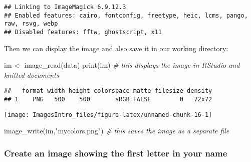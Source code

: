 \documentclass[
]{article}
\newenvironment{Shaded}{\begin{snugshade}}{\end{snugshade}}
\newcommand{\CommentTok}[1]{\textcolor[rgb]{0.56,0.35,0.01}{\textit{#1}}}
\newcommand{\FunctionTok}[1]{\textcolor[rgb]{0.00,0.00,0.00}{#1}}
\newcommand{\NormalTok}[1]{#1}
\newcommand{\OtherTok}[1]{\textcolor[rgb]{0.56,0.35,0.01}{#1}}
\newcommand{\StringTok}[1]{\textcolor[rgb]{0.31,0.60,0.02}{#1}}
\begin{document}
\begin{verbatim}
## Linking to ImageMagick 6.9.12.3
## Enabled features: cairo, fontconfig, freetype, heic, lcms, pango, raw, rsvg, webp
## Disabled features: fftw, ghostscript, x11
\end{verbatim}

Then we can display the image and also save it in our working directory:

\begin{Shaded}
\begin{Highlighting}[]
\NormalTok{im }\OtherTok{\textless{}{-}} \FunctionTok{image\_read}\NormalTok{(data) }
\FunctionTok{print}\NormalTok{(im) }\CommentTok{\# this displays the image in RStudio and knitted documents}
\end{Highlighting}
\end{Shaded}

\begin{verbatim}
##   format width height colorspace matte filesize density
## 1    PNG   500    500       sRGB FALSE        0   72x72
\end{verbatim}

\texttt{[image: ImagesIntro\_files/figure-latex/unnamed-chunk-16-1]}

\begin{Shaded}
\begin{Highlighting}[]
\FunctionTok{image\_write}\NormalTok{(im,}\StringTok{"mycolors.png"}\NormalTok{) }\CommentTok{\# this saves the image as a separate file}
\end{Highlighting}
\end{Shaded}

\hypertarget{create-an-image-showing-the-first-letter-in-your-name}{%
\subsubsection{Create an image showing the first letter in your
name}\label{create-an-image-showing-the-first-letter-in-your-name}}
\end{document}

